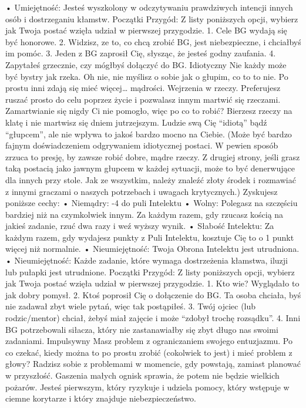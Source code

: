     • Umiejętność: Jesteś wyszkolony w odczytywaniu prawdziwych intencji innych osób i dostrzeganiu kłamstw.
Początki Przygód: Z listy poniższych opcji, wybierz jak Twoja postać wzięła udział w pierwszej przygodzie.
1. Cele BG wydają się być honorowe.
2. Widzisz, ze to, co chcą zrobić BG, jest niebezpieczne, i chciałbyś im pomóc.
3. Jeden z BG zaprosił Cię, słysząc, że jesteś godny zaufania.
4. Zapytałeś grzecznie, czy mógłbyś dołączyć do BG.
Idiotyczny
Nie każdy może być bystry jak rzeka.  Oh nie, nie myślisz o sobie jak o głupim, co to to nie. Po prostu inni zdają się mieć więcej… mądrości. Wejrzenia w rzeczy. Preferujesz ruszać prosto do celu poprzez życie i pozwalasz innym martwić się rzeczami. Zamartwianie się nigdy Ci nie pomogło, więc po co to robić? Bierzesz rzeczy na klatę i nie martwisz się dniem jutrzejszym.
Ludzie swą Cię “idiotą” bądź “głupcem”, ale nie wpływa to jakoś bardzo mocno na Ciebie. 
(Może być bardzo fajnym doświadczeniem odgrywaniem idiotycznej postaci. W pewien sposób zrzuca to presję, by zawsze robić dobre, mądre rzeczy. Z drugiej strony, jeśli grasz taką postacią jako jawnym głupcem w każdej sytuacji, może to być denerwujące dla innych przy stole. Jak ze wszystkim, należy znaleźć złoty środek i rozmawiać z innymi graczami o naszych potrzebach i uwagach krytycznych.)
Zyskujesz poniższe cechy:
    • Niemądry: -4 do puli Intelektu
    • Wolny: Polegasz na szczęściu bardziej niż na czymkolwiek innym. Za każdym razem, gdy rzucasz kością na jakieś zadanie, rzuć dwa razy i weź wyższy wynik.
    • Słabość Intelektu: Za każdym razem, gdy wydajesz punkty z Puli Intelektu, kosztuje Cię to o 1 punkt więcej niż normalnie.
    • Nieumiejętność: Twoja Obrona Intelektu jest utrudniona.
    • Nieumiejętność: Każde zadanie, które wymaga dostrzeżenia kłamstwa, iluzji lub pułapki jest utrudnione.
Początki Przygód: Z listy poniższych opcji, wybierz jak Twoja postać wzięła udział w pierwszej przygodzie.
1. Kto wie? Wyglądało to jak dobry pomysł.
2. Ktoś poprosił Cię o dołączenie do BG. Ta osoba chciała, byś nie zadawał zbyt wiele pytań, więc tak postąpiłeś.
3. Twój ojciec (lub rodzic/mentor) chciał, żebyś miał zajęcie i może “zdobył trochę rozsądku”.
4. Inni BG potrzebowali siłacza, który nie zastanawiałby się zbyt długo nas swoimi zadaniami.
Impulsywny
Masz problem z ograniczaniem swojego entuzjazmu. Po co czekać, kiedy można to po prostu zrobić (cokolwiek to jest) i mieć problem z głowy? Radzisz sobie z problemami w momencie, gdy powstają, zamiast planować w przyszłość. Gaszenia małych ognisk sprawia, że potem nie będzie wielkich pożarów. Jesteś pierwszym, który ryzykuje i udziela pomocy, który wstępuje w ciemne korytarze i który znajduje niebezpieczeństwo.
